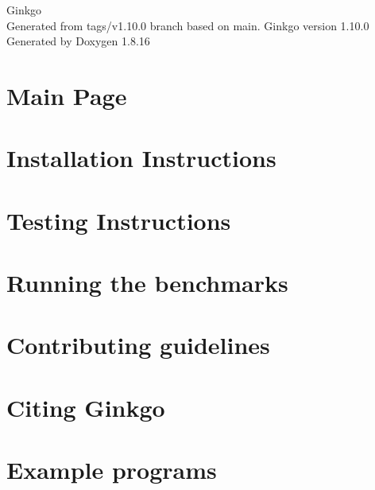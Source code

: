 \let\mypdfximage\pdfximage\def\pdfximage{\immediate\mypdfximage}\documentclass[twoside]{book}
\newcommand{\+}{\discretionary{\mbox{\scriptsize$\hookleftarrow$}}{}{}}
\newcommand{\clearemptydoublepage}{%
  \newpage{\pagestyle{empty}\cleardoublepage}%
}
\begin{document}
\hypersetup{pageanchor=false,
             bookmarksnumbered=true,
             pdfencoding=unicode
            }
\begin{titlepage}
\vspace*{7cm}
\begin{center}%
{\Large Ginkgo \\[1ex]\large Generated from tags/v1.\+10.\+0 branch based on main. Ginkgo version 1.\+10.\+0 }\\
\vspace*{1cm}
{\large Generated by Doxygen 1.8.16}\\
\end{center}
\end{titlepage}
\clearemptydoublepage
{}
\tableofcontents
\clearemptydoublepage
{}
\hypersetup{pageanchor=true}

\chapter{Main Page}
\label{index}\hypertarget{index}{}
\chapter{Installation Instructions}
\label{install_ginkgo}

\chapter{Testing Instructions}
\label{testing_ginkgo}

\chapter{Running the benchmarks}
\label{benchmarking_ginkgo}

\chapter{Contributing guidelines}
\label{contributing_guidelines}

\chapter{Citing Ginkgo}
\label{citing_ginkgo}

\chapter{Example programs}
\label{Examples}

\end{document}

